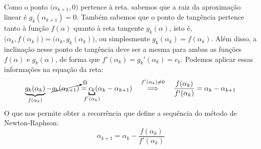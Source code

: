 Como o ponto $\big(\alpha_{k+1}, 0\big)$ pertence à reta.
sabemos que a raiz da aproximação linear é $g_k(\alpha_{k+1}) = 0$.
Também sabemos que o ponto de tangência
pertence tanto à função $f(\alpha)$
quanto à reta tangente $g_k(\alpha)$, isto é,
$\big(\alpha_k, f(\alpha_k)\big) = \big(\alpha_k, g_k(\alpha_k)\big)$,
ou simplesmente $g_k(\alpha_k) = f(\alpha_k)$.
Além disso, a inclinação nesse ponto de tangência
deve ser a mesma para ambas as funções $f(\alpha)$ e $g_k(\alpha)$,
de forma que $f'(\alpha_k) = g_k'(\alpha_k) = c_k$.
Podemos aplicar essas informações na equação da reta:
\[
    \underbrace{g_k(\alpha_k)}_{f(\alpha_k)}
    - \cancelto{0}{g_k(\alpha_{k+1})}
  =
    \underbracket[1.1pt]{c_k}_{\mathclap{f'(\alpha_k)}}
    (\alpha_k - \alpha_{k+1})
  \quad\stackfirst{f'(\alpha_k) \ne 0}{\implies}\quad
  \dfrac{f(\alpha_k)}{f'(\alpha_k)} = \alpha_k - \alpha_{k+1}
\]
O que nos permite obter a recorrência
que define a sequência do método de Newton-Raphson:
\[\tag{NR}
  \alpha_{k+1} = \alpha_k - \dfrac{f(\alpha_k)}{f'(\alpha_k)}
\]
